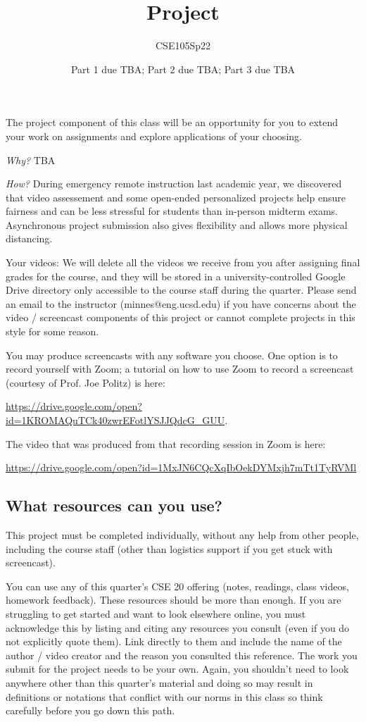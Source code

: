 \documentclass[12pt, oneside]{article}
\author{CSE105Sp22}
\title{Project}
\date{Part 1 due TBA; Part 2 due TBA; Part 3 due TBA}
\begin{document}
\maketitle
\thispagestyle{fancy}
The project component of this class will be an opportunity for you to extend your 
work on assignments and explore applications of your choosing. 

{\it Why?}
TBA

{\it How?} During emergency remote instruction last academic year, we discovered
that video assessement and some open-ended personalized projects help ensure fairness
and can be less stressful for students than in-person midterm exams. Asynchronous project
submission also gives flexibility and allows more physical distancing.

Your videos: We will delete all the videos we receive from you after assigning final grades for the course, 
and they will be stored in a university-controlled Google Drive directory 
only accessible to the course staff during the quarter. 
Please send an email to the instructor (minnes@eng.ucsd.edu) if you have 
concerns about 
the video / screencast components of this project or cannot complete projects in this style for some reason.

You may produce screencasts with any software you choose. 
One option is to record yourself with Zoom; a tutorial on how to use Zoom to record a 
screencast (courtesy of Prof. Joe Politz)  is here: 

\url{https://drive.google.com/open?id=1KROMAQuTCk40zwrEFotlYSJJQdcG_GUU}.

The video that was produced from that recording session in Zoom is here:

\url{https://drive.google.com/open?id=1MxJN6CQcXqIbOekDYMxjh7mTt1TyRVMl}

\subsection*{What resources can you use?}
This project must be completed individually, without any help from other people, 
including the course staff (other than logistics support if you get stuck with screencast). 

You can use any of this quarter's CSE 20 offering (notes, readings, class videos, homework feedback). 
These resources should be more than enough. If you are struggling to get started and want to 
look elsewhere online, you must acknowledge this by listing and citing any resources you consult 
(even if you do not explicitly quote them). Link directly to them and include the name of the 
author / video creator and the reason you consulted this reference. The work you submit for 
the project needs to be your own. Again, you shouldn't need to look anywhere other 
than this quarter's material and doing so may result in definitions or notations 
that conflict with our norms in this class so think carefully before you go down this path.
\end{document}
